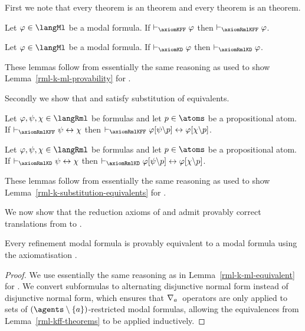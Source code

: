 First we note that every \axiomKFF{} theorem is an \axiomRmlKFF{} theorem and every \axiomKD{} theorem is an \axiomRmlKD{} theorem.

\begin{lemma}\label{rml-kff-ml-provability}
Let $\phi \in \langMl$ be a modal formula.
If $\proves_\axiomKFF \phi$ then $\proves_\axiomRmlKFF \phi$.
\end{lemma}

\begin{lemma}\label{rml-kd-ml-provability}
Let $\phi \in \langMl$ be a modal formula.
If $\proves_\axiomKD \phi$ then $\proves_\axiomRmlKD \phi$.
\end{lemma}

These lemmas follow from essentially the same reasoning as used to show Lemma~\ref{rml-k-ml-provability} for \axiomRmlK{}.

Secondly we show that \axiomRmlKFF{} and \axiomRmlKD{} satisfy substitution of equivalents.

\begin{lemma}\label{rml-kff-substitution-equivalents}
Let $\phi, \psi, \chi \in \langRml$ be formulas and let $\atomP \in \atoms$ be a propositional atom.
If $\proves_\axiomRmlKFF \psi \iff \chi$ then $\proves_\axiomRmlKFF \phi[\psi\backslash\atomP] \iff \phi[\chi\backslash\atomP]$.
\end{lemma}

\begin{lemma}\label{rml-kd-substitution-equivalents}
Let $\phi, \psi, \chi \in \langRml$ be formulas and let $\atomP \in \atoms$ be a propositional atom.
If $\proves_\axiomRmlKD \psi \iff \chi$ then $\proves_\axiomRmlKD \phi[\psi\backslash\atomP] \iff \phi[\chi\backslash\atomP]$.
\end{lemma}

These lemmas follow from essentially the same reasoning as used to show Lemma~\ref{rml-k-substitution-equivalents} for \axiomRmlK{}.

We now show that the reduction axioms of \logicRmlKFF{} and \logicRmlKD{} admit provably correct translations from \langRml{} to \langMl{}.

\begin{lemma}\label{rml-kff-ml-equivalent}
Every refinement modal formula is provably equivalent to a modal formula using the axiomatisation \axiomRmlKFF{}.
\end{lemma}

\begin{proof}
We use essentially the same reasoning as in Lemma~\ref{rml-k-ml-equivalent} for \axiomRmlK{}.
We convert subformulas to alternating disjunctive normal form instead of disjunctive normal form, which ensures that $\nabla_{a}$~operators are only applied to sets of $(\agents \setminus \{\agentA\})$-restricted modal formulas, allowing the equivalences from Lemma~\ref{rml-kff-theorems} to be applied inductively.
\end{proof}

